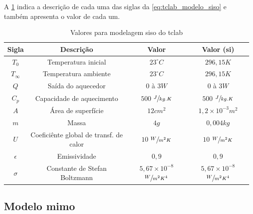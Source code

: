A \cref{tab:tclab_modelo_siso_valores} indica a descrição de cada uma das siglas da
\cref{eq:tclab_modelo_siso} e também apresenta o valor de cada um.

\begin{table}[h]
	\caption{Valores para modelagem \acrshort{siso} do \acrshort{tclab}}
	\label{tab:tclab_modelo_siso_valores}
	\centering
		\begin{tabular}{cccc} \toprule
			{Sigla} 		& {Descrição} 								& {Valor} 											& {Valor (\acrshort{si})} 							\\ \midrule
			$T_{0}$ 		& Temperatura inicial 						& $23^\circ C$ 										& $296{,}15 K $										\\
			$T_{\infty}$	& Temperatura ambiente						& $23^\circ C$										& $296{,}15 K $										\\
			$Q$				& Saída do aquecedor						& $0$ à $3 W$										& $0$ à $3 W$										\\
			$C_p$			& Capacidade de aquecimento					& $500$ $\sfrac{J}{kg.K}$							& $500$ $\sfrac{J}{kg.K}$							\\
			$A$				& Área de superfície						& $12 cm^{2}$										& $1{,}2 \times 10^{-3} m^{2}$						\\
			$m$				& Massa										& $4 g$												& $0{,}004 kg	$									\\
			$U$				& Coeficiênte global de transf. de calor	& $10$ $\sfrac{W}{m^{2}K}$							& $10$ $\sfrac{W}{m^{2}K}$							\\
			$\epsilon$		& Emissividade								& $0{,}9$											& $0{,}9$											\\
			$\sigma$		& Constante de Stefan Boltzmann				& $5{,}67 \times 10^{-8}$ $\sfrac{W}{m^{2}K^{4}}$	& $5{,}67 \times 10^{-8}$ $\sfrac{W}{m^{2}K^{4}}$	\\ \bottomrule
		\end{tabular}
\end{table}

\subsection{Modelo \acrshort{mimo}}
\label{subsec:tclab_modelo_mimo}

